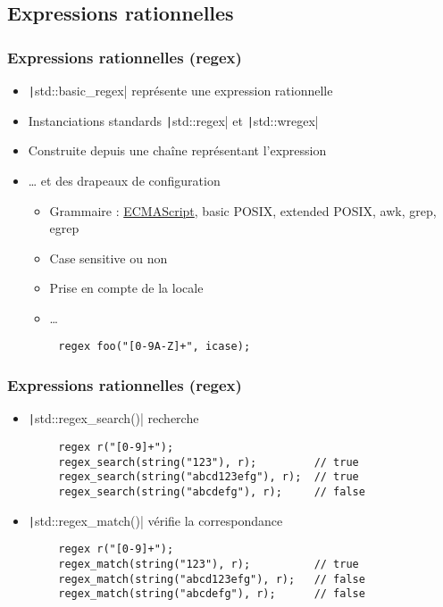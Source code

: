\documentclass[C++.tex]{subfiles}
\begin{document}
\subsection*{Expressions rationnelles}
\begin{frame}[fragile]
	\frametitle{Expressions rationnelles (regex)}
	\begin{itemize}
		\item \texttt|std::basic_regex| représente une expression rationnelle
		\item Instanciations standards \texttt|std::regex| et \texttt|std::wregex|
		\item Construite depuis une chaîne représentant l'expression
		\item \ldots{} et des drapeaux de configuration
		\begin{itemize}
			\item Grammaire : \underline{ECMAScript}, basic POSIX, extended POSIX, awk, grep, egrep
			\item Case sensitive ou non
			\item Prise en compte de la locale
			\item \ldots{}
		\end{itemize}
	\end{itemize}

	\begin{verbatim}
		regex foo("[0-9A-Z]+", icase);
	\end{verbatim}
\end{frame}

\begin{frame}[fragile]
	\frametitle{Expressions rationnelles (regex)}
	\begin{itemize}
		\item\texttt|std::regex_search()| recherche
	\end{itemize}

	\begin{verbatim}
		regex r("[0-9]+");
		regex_search(string("123"), r);         // true
		regex_search(string("abcd123efg"), r);  // true
		regex_search(string("abcdefg"), r);     // false
	\end{verbatim}

	\begin{itemize}
		\item \texttt|std::regex_match()| vérifie la correspondance
	\end{itemize}

	\begin{verbatim}
		regex r("[0-9]+");
		regex_match(string("123"), r);          // true
		regex_match(string("abcd123efg"), r);   // false
		regex_match(string("abcdefg"), r);      // false
	\end{verbatim}
\end{frame}
\end{document}
